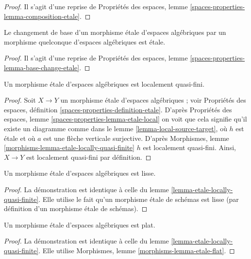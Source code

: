 \begin{proof}
Il s'agit d'une reprise de
Propriétés des espaces, lemme \ref{spaces-properties-lemma-composition-etale}.
\end{proof}

\begin{lemma}
\label{lemma-base-change-etale}
Le changement de base d'un morphisme étale d'espaces algébriques
par un morphisme quelconque d'espaces algébriques est étale.
\end{lemma}

\begin{proof}
Il s'agit d'une reprise de
Propriétés des espaces, lemme \ref{spaces-properties-lemma-base-change-etale}.
\end{proof}

\begin{lemma}
\label{lemma-etale-locally-quasi-finite}
Un morphisme étale d'espaces algébriques est localement quasi-fini.
\end{lemma}

\begin{proof}
Soit $X \to Y$ un morphisme étale d'espaces algébriques ; voir
Propriétés des espaces, définition \ref{spaces-properties-definition-etale}.
D'après
Propriétés des espaces, lemme \ref{spaces-properties-lemma-etale-local}
on voit que cela signifie qu'il existe un diagramme comme dans le
lemme \ref{lemma-local-source-target},
où $h$ est étale et où $a$ est une flèche verticale surjective. D'après
Morphismes, lemme \ref{morphisms-lemma-etale-locally-quasi-finite}
$h$ est localement quasi-fini. Ainsi, $X \to Y$ est localement quasi-fini
par définition.
\end{proof}

\begin{lemma}
\label{lemma-etale-smooth}
Un morphisme étale d'espaces algébriques est lisse.
\end{lemma}

\begin{proof}
La démonstration est identique à celle du
lemme \ref{lemma-etale-locally-quasi-finite}.
Elle utilise le fait qu'un morphisme étale de schémas est lisse
(par définition d'un morphisme étale de schémas).
\end{proof}

\begin{lemma}
\label{lemma-etale-flat}
Un morphisme étale d'espaces algébriques est plat.
\end{lemma}

\begin{proof}
La démonstration est identique à celle du
lemme \ref{lemma-etale-locally-quasi-finite}.
Elle utilise
Morphismes, lemme \ref{morphisms-lemma-etale-flat}.
\end{proof}

